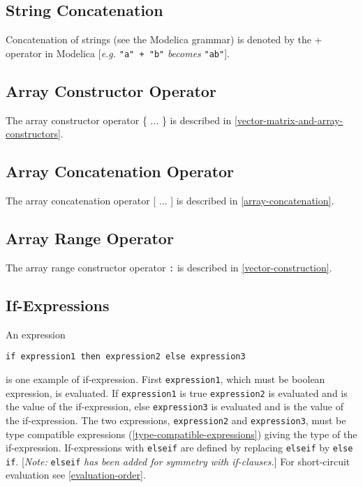\subsection{String Concatenation}
 
Concatenation of strings (see the Modelica grammar) is denoted by the +
operator in Modelica {[}\emph{e.g.} \lstinline[basicstyle=\ttfamily]!"a" + "b"! \emph{becomes} \lstinline[basicstyle=\ttfamily]!"ab"!{]}.

\subsection{Array Constructor Operator}

The array constructor operator \{ ... \} is described in \autoref{vector-matrix-and-array-constructors}.

\subsection{Array Concatenation Operator}

The array concatenation operator {[} ... {]} is described in \autoref{array-concatenation}.

\subsection{Array Range Operator}

The array range constructor operator \lstinline[basicstyle=\ttfamily]!:! is described in \autoref{vector-construction}.

\subsection{If-Expressions}

An expression
\begin{lstlisting}[language=modelica]
if expression1 then expression2 else expression3
\end{lstlisting}

is one example of if-expression. First \lstinline[basicstyle=\ttfamily]!expression1!, which must be
boolean expression, is evaluated. If \lstinline[basicstyle=\ttfamily]!expression1! is true \lstinline[basicstyle=\ttfamily]!expression2! is
evaluated and is the value of the if-expression, else \lstinline[basicstyle=\ttfamily]!expression3! is
evaluated and is the value of the if-expression. The two expressions,
\lstinline[basicstyle=\ttfamily]!expression2! and \lstinline[basicstyle=\ttfamily]!expression3!, must be type compatible expressions
(\autoref{type-compatible-expressions}) giving the type of the if-expression. If-expressions with
\lstinline[basicstyle=\ttfamily]!elseif! are defined by replacing \lstinline[basicstyle=\ttfamily]!elseif! by \lstinline[basicstyle=\ttfamily]!else if!. {[}\emph{Note:}
\lstinline[basicstyle=\ttfamily]!elseif! \emph{has been added for symmetry with if-clauses.}{]} For
short-circuit evaluation see \autoref{evaluation-order}.

